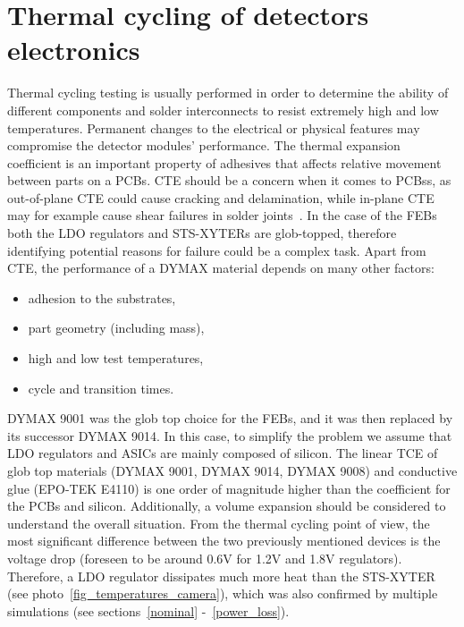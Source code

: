\newpage
\section{Thermal cycling of detectors electronics}
\label{thermal_cycling}
Thermal cycling testing is usually performed in order to determine the ability of different components and solder interconnects to resist extremely high and low temperatures. Permanent changes to the electrical or physical features may compromise the detector modules' performance. The thermal expansion coefficient is an important property of adhesives that affects relative movement between parts on a \glspl{PCB}. \gls{CTE} should be a concern when it comes to \glspl{PCB}s, as out-of-plane \gls{CTE} could cause cracking and delamination, while in-plane \gls{CTE} may for example cause shear failures in solder joints~\cite{cte_report}. In the case of the \gls{FEB}s both the \gls{LDO} regulators and \gls{STS}-XYTERs are glob-topped, therefore identifying potential reasons for failure could be a complex task. Apart from \gls{CTE}, the performance of a DYMAX material depends on many other factors:
\begin{itemize}
    \item adhesion to the substrates,
    \item part geometry (including mass),
    \item high and low test temperatures,
    \item cycle and transition times.
\end{itemize}
DYMAX 9001 was the glob top choice for the \glspl{FEB}, and it was then replaced by its successor DYMAX 9014. In this case, to simplify the problem we assume that \gls{LDO} regulators and \glspl{ASIC} are mainly composed of silicon. The linear TCE of glob top materials (DYMAX 9001, DYMAX 9014, DYMAX 9008) and conductive glue (EPO-TEK E4110) is one order of magnitude higher than the coefficient for the \glspl{PCB} and silicon. Additionally, a volume expansion should be considered to understand the overall situation. From the thermal cycling point of view, the most significant difference between the two previously mentioned devices is the voltage drop (foreseen to be around 0.6V for 1.2V and 1.8V regulators). Therefore, a \gls{LDO} regulator dissipates much more heat than the \gls{STS}-XYTER (see photo~\ref{fig_temperatures_camera}), which was also confirmed by multiple simulations (see sections~\ref{nominal} -~\ref{power_loss}).

